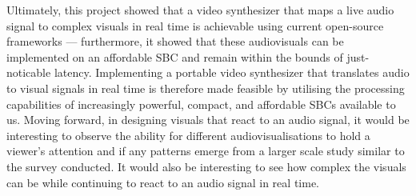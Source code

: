 \documentclass{report}
\begin{document}
Ultimately, this project showed that a video synthesizer that maps a live audio signal to complex visuals in real time is achievable using current open-source frameworks --- furthermore, it showed that these audiovisuals can be implemented on an affordable SBC and remain within the bounds of just-noticable latency. Implementing a portable video synthesizer that translates audio to visual signals in real time is therefore made feasible by utilising the processing capabilities of increasingly powerful, compact, and affordable SBCs available to us. Moving forward, in designing visuals that react to an audio signal, it would be interesting to observe the ability for different audiovisualisations to hold a viewer's attention and if any patterns emerge from a larger scale study similar to the survey conducted. It would also be interesting to see how complex the visuals can be while continuing to react to an audio signal in real time.
\printbibliography

\begin{appendices}
  
\end{appendices}
\end{document}
